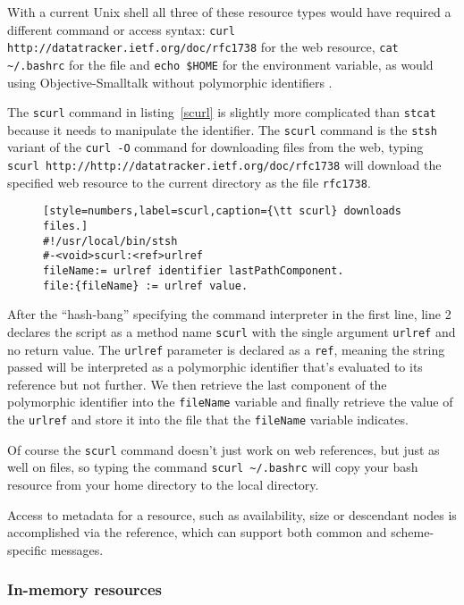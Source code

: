 \documentclass[preprint,authoryear]{acm_proc_article-sp}
\begin{document}
With a current Unix shell all three of these resource types would have required a different
command or access syntax:   {\tt curl http://datatracker.ietf.org/doc/rfc1738} for the
web resource, {\tt cat  \~\//.bashrc} for the file and {\tt echo \$HOME} for the environment
variable, as would using Objective-Smalltalk without polymorphic identifiers .

The {\tt scurl} command in listing~\ref{scurl} is slightly more complicated than {\tt stcat} because
it needs to manipulate the identifier.  The {\tt scurl} command
is the {\tt stsh} variant of the {\tt curl -O} command for downloading files from the web, typing
{\tt scurl http://http://datatracker.ietf.org/doc/rfc1738} will download the specified web resource
to the current directory as the file {\tt rfc1738}.

\begin{figure}[htbp]
\begin{lstlisting}[style=numbers,label=scurl,caption={\tt scurl} downloads files.]
#!/usr/local/bin/stsh
#-<void>scurl:<ref>urlref
fileName:= urlref identifier lastPathComponent.
file:{fileName} := urlref value.
\end{lstlisting}
\end{figure}

After the ``hash-bang'' specifying the command interpreter in the first line, line 2 declares
the script as a method name {\tt scurl} with the single argument {\tt urlref} and no return
value.  The {\tt urlref} parameter is declared as a {\tt ref}, meaning the string passed will
be interpreted as a polymorphic identifier that's evaluated to its reference but not further.
We then retrieve the last component of the polymorphic identifier into the {\tt fileName}
variable and finally retrieve the value of the {\tt urlref} and store it into the file that
the {\tt fileName} variable indicates.

Of course the {\tt scurl} command doesn't just work on web references, but just as well
on files, so typing the command {\tt scurl \~\//.bashrc} will copy your bash resource from your home directory
to the local directory.

Access to metadata for a resource, such as availability, size or descendant nodes
is accomplished via the reference, which can support both common and scheme-specific
messages.

\subsubsection{In-memory resources}
\label{inmemory}
\end{document}
